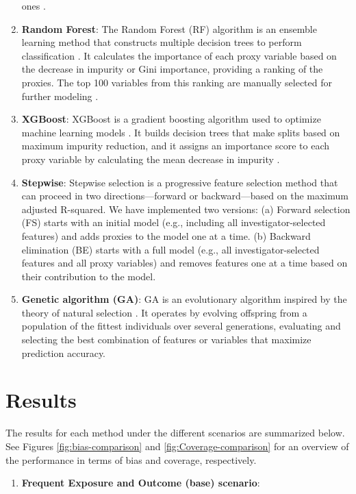 \documentclass[sn-vancouver,Numbered,lineno,pdflatex]{sn-jnl}
\providecommand{\tightlist}{%
  \setlength{\itemsep}{0pt}\setlength{\parskip}{0pt}}
\begin{document}
\begin{enumerate}
  ones \citep{karim2018can}.
\item
  \textbf{Random Forest}: The Random Forest (RF) algorithm is an
  ensemble learning method that constructs multiple decision trees to
  perform classification \citep{breiman2001random}. It calculates the
  importance of each proxy variable based on the decrease in impurity or
  Gini importance, providing a ranking of the proxies. The top 100
  variables from this ranking are manually selected for further modeling
  \citep{schneeweiss2017variable}.
\item
  \textbf{XGBoost}: XGBoost is a gradient boosting algorithm used to
  optimize machine learning models \citep{chen2016xgboost}. It builds
  decision trees that make splits based on maximum impurity reduction,
  and it assigns an importance score to each proxy variable by
  calculating the mean decrease in impurity
  \citep{xiao2024interpretable}.
\item
  \textbf{Stepwise}: Stepwise selection is a progressive feature
  selection method that can proceed in two directions---forward or
  backward---based on the maximum adjusted R-squared. We have
  implemented two versions: (a) Forward selection (FS) starts with an
  initial model (e.g., including all investigator-selected features) and
  adds proxies to the model one at a time. (b) Backward elimination (BE)
  starts with a full model (e.g., all investigator-selected features and
  all proxy variables) and removes features one at a time based on their
  contribution to the model.
\item
  \textbf{Genetic algorithm (GA)}: GA is an evolutionary algorithm
  inspired by the theory of natural selection
  \citep{holland1975adaptation}. It operates by evolving offspring from
  a population of the fittest individuals over several generations,
  evaluating and selecting the best combination of features or variables
  that maximize prediction accuracy.
\end{enumerate}

\section{Results}\label{results}

The results for each method under the different scenarios are summarized
below. See Figures \ref{fig:bias-comparison} and
\ref{fig:Coverage-comparison} for an overview of the performance in
terms of bias and coverage, respectively.

\begin{enumerate}
\def\labelenumi{(\roman{enumi})}
\tightlist
\item
  \textbf{Frequent Exposure and Outcome (base) scenario}:
\end{enumerate}
\end{document}
